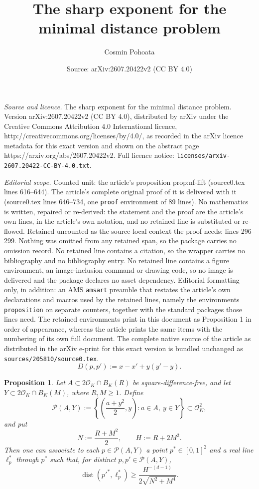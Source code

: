 \documentclass[10pt,a4paper]{amsart}
\title{The sharp exponent for the minimal distance problem}
\author{Cosmin Pohoata}
\date{Source: arXiv:2607.20422v2 (CC BY 4.0)}
\newtheorem{proposition}{Proposition}
\newcommand{\OK}{\mathcal{O}_K}
\newcommand{\dist}{\operatorname{dist}}
\begin{document}
\maketitle

\noindent\emph{Source and licence.} The sharp exponent for the minimal distance problem. Version arXiv:2607.20422v2 (CC BY 4.0), distributed by arXiv under the Creative Commons Attribution 4.0 International licence, http://creativecommons.org/licenses/by/4.0/, as recorded in the arXiv licence metadata for this exact version and shown on the abstract page https://arxiv.org/abs/2607.20422v2. Full licence notice: \texttt{licenses/arxiv-2607.20422-CC-BY-4.0.txt}.\par\smallskip

\noindent\textit{Editorial scope.} Counted unit: the article's proposition prop:nf-lift (source0.tex lines 616--644). The article's complete original proof of it is delivered with it (source0.tex lines 646--734, one \texttt{proof} environment of 89 lines). No mathematics is written, repaired or re-derived: the statement and the proof are the article's own lines, in the article's own notation, and no retained line is substituted or re-flowed.  Retained uncounted as the source-local context the proof needs: lines 296--299.  Nothing was omitted from any retained span, so the package carries no omission record.  No retained line contains a citation, so the wrapper carries no bibliography and no bibliography entry.  No retained line contains a figure environment, an image-inclusion command or drawing code, so no image is delivered and the package declares no asset dependency.  Editorial formatting only, in addition: an AMS \texttt{amsart} preamble that restates the article's own declarations and macros used by the retained lines, namely the environments \texttt{proposition} on separate counters, together with the standard packages those lines need.  The retained environments print in this document as Proposition 1 in order of appearance, whereas the article prints the same items with the numbering of its own full document.  The complete native source of the article as distributed in the arXiv e-print for this exact version is bundled unchanged as \texttt{sources/205810/source0.tex}.
\begin{equation}
\label{eq:D-definition}
        D(p,p'):=x-x'+y(y'-y).
\end{equation}

\begin{proposition}
\label{prop:nf-lift}
Let $A\subset2\OK\cap B_K(R)$ be square-difference-free, and let
$Y\subset2\OK\cap B_K(M)$, where $R,M\ge1$. Define
\[
        \mathcal P(A,Y)
        :=
        \left\{
        \left(\frac{a+y^2}{2},y\right):
        a\in A,\ y\in Y
        \right\}
        \subset\OK^2,
\]
and put
\begin{equation}
\label{eq:N-H}
        N:=\frac{R+M^2}{2},
        \qquad
        H:=R+2M^2.
\end{equation}
Then one can associate to each $p\in\mathcal P(A,Y)$ a point
$p^*\in[0,1]^2$ and a real line $\ell_p^*$ through $p^*$ such that,
for distinct $p,p'\in\mathcal P(A,Y)$,
\[
        \dist(p'^*,\ell_p^*)
        \ge
        \frac{H^{-(d-1)}}{2\sqrt{N^2+M^4}}.
\]
\end{proposition}
\end{document}
